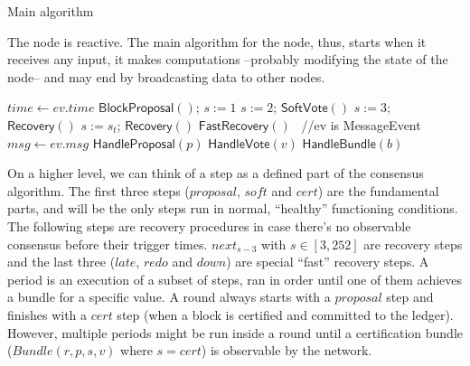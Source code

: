 \documentclass[10pt,a4paper]{article}
\begin{document}
\begin{section}{Main algorithm}
%

The node is reactive. The main algorithm for the node, thus, starts when it receives 
any input, it makes computations --probably modifying the state of the node-- and 
may end by broadcasting data to other nodes.

\begin{algorithm}[H]
    \caption{\underline{Main node algorithm}}
    \label{algo:main}
    \begin{algorithmic}[1]
    
        \State $time \gets ev.time$
            \State $\mathsf{BlockProposal}()$; $s:=1$
            \State $s:=2$; $\mathsf{SoftVote}()$
            \State $s:=3$; $\mathsf{Recovery}()$
        \ElsIf{$time\in[\max\{4\lambda, \Lambda \} + 2^{s_t-3}\lambda, \max\{4\lambda, \Lambda \} + 2^{s_t-2}\lambda)$ for some $s\le s_t \le 252$}
            \State $s:=s_t $; $\mathsf{Recovery}()$
            \State $\mathsf{FastRecovery}()$
        \EndIf
    \Else \ //ev is MessageEvent
        \State $msg \gets ev.msg$
            \State $\mathsf{HandleProposal}(p)$
            \State $\mathsf{HandleVote}(v)$
            \State $\mathsf{HandleBundle}(b)$
        \EndIf
    \EndIf

    \EndFunction
    \end{algorithmic}
\end{algorithm}

On a higher level, we can think of a step as a defined part of the consensus algorithm. The first three steps
($proposal$, $soft$ and $cert$)
are the fundamental parts, and will be the only steps run in normal, ``healthy'' functioning conditions.
The following steps are recovery procedures in case there's no observable consensus before their trigger times.
$next_{s-3}$ with $s \in [3, 252]$ are recovery steps and the last three ($late$, $redo$ and $down$)
are special ``fast'' recovery steps.
A period is an execution of a subset of steps, ran in order until one of them achieves 
a bundle for a specific value. A round always starts with a $proposal$ step and finishes with a $cert$
step (when a block is certified and committed to the ledger). However, multiple periods might
be run inside a round until a certification bundle ($Bundle(r,p,s,v) $ where $s = cert$) is observable by the network.


\end{section}
\end{document}

